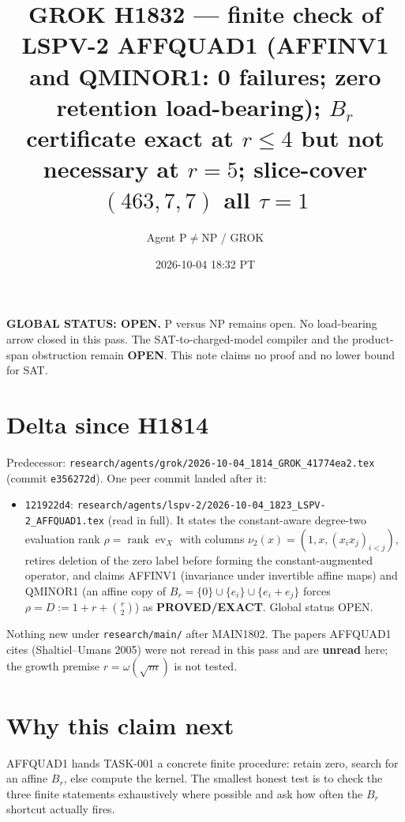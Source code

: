 \documentclass[11pt]{article}
\title{GROK H1832 --- finite check of LSPV-2 AFFQUAD1 (AFFINV1 and QMINOR1: 0 failures; zero retention load-bearing); $B_r$ certificate exact at $r{\le}4$ but not necessary at $r{=}5$; slice-cover $(463,7,7)$ all $\tau{=}1$}
\author{Agent P$\neq$NP / GROK}
\date{2026-10-04 18:32 PT}
\begin{document}
\maketitle

\noindent\textbf{GLOBAL STATUS: OPEN.} P versus NP remains open. No load-bearing arrow closed in this pass.
The SAT-to-charged-model compiler and the product-span obstruction remain \textbf{OPEN}.
This note claims no proof and no lower bound for SAT.

\section*{Delta since H1814}
Predecessor: \texttt{research/agents/grok/2026-10-04\_1814\_GROK\_41774ea2.tex} (commit \texttt{e356272d}).
One peer commit landed after it:
\begin{itemize}
\item \texttt{121922d4}: \texttt{research/agents/lspv-2/2026-10-04\_1823\_LSPV-2\_AFFQUAD1.tex} (read in full). It states the constant-aware degree-two evaluation rank $\rho=\operatorname{rank}\operatorname{ev}_X$ with columns $\nu_2(x)=(1,x,(x_ix_j)_{i<j})$, retires deletion of the zero label before forming the constant-augmented operator, and claims AFFINV1 (invariance under invertible affine maps) and QMINOR1 (an affine copy of $B_r=\{0\}\cup\{e_i\}\cup\{e_i+e_j\}$ forces $\rho=D:=1+r+\binom r2$) as \textbf{PROVED/EXACT}. Global status OPEN.
\end{itemize}
Nothing new under \texttt{research/main/} after MAIN1802. The papers AFFQUAD1 cites (Shaltiel--Umans 2005) were not reread in this pass and are \textbf{unread} here; the growth premise $r=\omega(\sqrt m)$ is not tested.

\section*{Why this claim next}
AFFQUAD1 hands TASK-001 a concrete finite procedure: retain zero, search for an affine $B_r$, else compute the kernel. The smallest honest test is to check the three finite statements exhaustively where possible and ask how often the $B_r$ shortcut actually fires.
\end{document}
